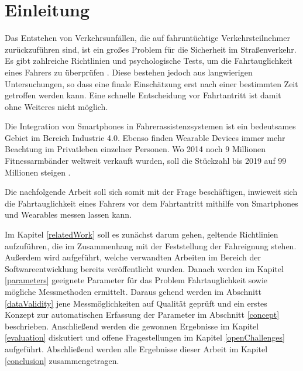 \section{Einleitung}
\label{introduction}

Das Entstehen von Verkehrsunfällen, die auf fahruntüchtige Verkehrsteilnehmer zurückzuführen sind, ist ein großes Problem für die Sicherheit im Straßenverkehr. Es gibt zahlreiche Richtlinien und psychologische Tests, um die Fahrtauglichkeit eines Fahrers zu überprüfen \cite{drivervehiclelicencingagency,testverfahrenpsychometrischefahreignung,begutachtungsrichtlinien,beurteilungskriterien}. Diese bestehen jedoch aus langwierigen Untersuchungen, so dass eine finale Einschätzung erst nach einer bestimmten Zeit getroffen werden kann.  Eine schnelle Entscheidung vor Fahrtantritt ist damit ohne Weiteres nicht möglich.

Die Integration von Smartphones in Fahrerassistenzsystemen ist ein bedeutsames Gebiet im Bereich Industrie 4.0. Ebenso finden Wearable Devices immer mehr Beachtung im Privatleben einzelner Personen. Wo 2014 noch 9 Millionen Fitnessarmbänder weltweit verkauft wurden, soll die Stückzahl bis 2019 auf 99 Millionen steigen \cite{wearabletracking}. 

Die nachfolgende Arbeit soll sich somit mit der Frage beschäftigen, inwieweit sich die Fahrtauglichkeit eines Fahrers vor dem Fahrtantritt mithilfe von Smartphones und Wearables messen lassen kann.  

Im Kapitel \ref{relatedWork} soll es zunächst darum gehen, geltende Richtlinien aufzuführen, die im Zusammenhang mit der Feststellung der Fahreignung stehen. Außerdem wird aufgeführt, welche verwandten Arbeiten im Bereich der Softwareentwicklung bereits veröffentlicht wurden. Danach werden im Kapitel \ref{parameters} geeignete Parameter für das Problem Fahrtauglichkeit sowie mögliche Messmethoden ermittelt. Daraus gehend werden im Abschnitt \ref{dataValidity} jene Messmöglichkeiten auf Qualität geprüft und ein erstes Konzept zur automatischen Erfassung der Parameter im Abschnitt \ref{concept} beschrieben. Anschließend werden die gewonnen Ergebnisse im Kapitel \ref{evaluation} diskutiert und offene Fragestellungen im Kapitel \ref{openChallenges} aufgeführt. Abschließend werden alle Ergebnisse dieser Arbeit im Kapitel \ref{conclusion} zusammengetragen.